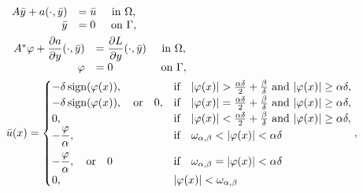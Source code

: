 \documentclass[11pt,a4paper]{amsart}
\newcommand{\om}{\Omega}
\newcommand{\ga}{\Gamma}
\newcommand{\sign}{\mathrm{sign}}
\begin{document}
\begin{subequations}\label{eq:optimal_system_P0}
	\begin{align}
&\begin{array}{rlc}
	A\bar y + a(\cdot, \bar y) & = \bar u & \text{ in } \om, \\
      \bar y &= 0 & \text{ on } \ga, 
\end{array}\\
%
&\,\begin{array}{rlc}
	A^*\varphi + \dfrac{\partial a}{\partial y}(\cdot,\bar y) & = \dfrac{\partial L}{\partial y}(\cdot,\bar y)& \text{ in } \om, \\
      \varphi &= 0 & \text{ on } \ga ,
\end{array} \label{eq:optimal_system_P0_b}\\
& \bar u(x) = 
\begin{cases} 
-\delta \,\sign(\varphi(x)), &\text{if}\quad |\varphi(x)| > \frac{\alpha \delta}{2} + \frac{\beta}{\delta} \text{ and } |\varphi(x)| \ge \alpha\delta,\\
-\delta \,\sign(\varphi(x)), \quad\text{or}\quad 0, &\text{if}\quad |\varphi(x)| = \frac{\alpha \delta}{2} + \frac{\beta}{\delta} \text{ and } |\varphi(x)| \ge \alpha\delta,\\
0, & \text{if}\quad |\varphi(x)| <\frac{\alpha \delta}{2} + \frac{\beta}{\delta} \text{ and } |\varphi(x)| \ge \alpha\delta,\\
-\dfrac{\varphi}{\alpha},&\text{if}\quad\omega_{\alpha,\beta}< |\varphi(x)|<\alpha\delta \vspace{2mm}\\
-\dfrac{\varphi}{\alpha}, \quad\text{or}\quad 0&\text{if}\quad\omega_{\alpha,\beta}= |\varphi(x)|<\alpha\delta \\
0, &|\varphi(x)|<\omega_{\alpha,\beta}
\end{cases}
, \label{eq:optimal_system_P0_c}
\end{align}
\end{subequations}
 
\end{document}
